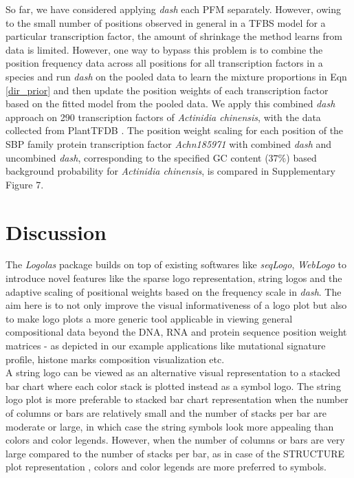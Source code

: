 \documentclass{bmcart}
\begin{document}
So far, we have considered applying \textit{dash}
each PFM separately. However, owing to the small number of positions observed in general in a TFBS model for a particular transcription factor, the amount of shrinkage the method learns from data is limited. However, one way to bypass this problem is to combine the position frequency data across all positions for all transcription factors in a species and run \textit{dash} on the pooled data to learn the mixture proportions in Eqn \ref{dir_prior} and then update the position weights of each transcription factor based on the fitted model from the pooled data. We apply this combined \textit{dash} approach on 290 transcription factors of \textit{Actinidia chinensis}, with the data collected from PlantTFDB \cite{Jin2017} \cite{Jin2015} \cite{Jin2014}. The position weight scaling for each position of the SBP family protein transcription factor \textit{Achn185971} with combined \textit{dash} and uncombined \textit{dash}, corresponding to the specified GC content ($37 \%$) based background probability for \textit{Actinidia chinensis}, is compared in Supplementary Figure 7.  


\section*{Discussion}

The \textit{Logolas} package builds on top of existing softwares like \textit{seqLogo}, \textit{WebLogo} \cite{Crooks2004} \cite{Bembom2017} to introduce novel features like the sparse logo representation, string logos and the adaptive scaling of positional weights based on the frequency scale in \textit{dash}. The aim here is to not only improve the visual informativeness of a logo plot but also to make logo plots a more generic tool applicable in viewing general compositional data beyond the DNA, RNA and protein sequence position weight matrices - as depicted in our example applications like mutational signature profile, histone marks composition visualization etc. \\ [3 pt]

A string logo can be viewed as an alternative visual representation to a stacked bar chart where each color stack is plotted instead as a symbol logo. The string logo plot is more preferable to stacked bar chart representation when the number of columns or bars are relatively small and the number of stacks per bar are moderate or large, in which case the string symbols look more appealing than colors and color legends. However, when the number of columns or bars are very large compared to the number of stacks per bar, as in case of the STRUCTURE plot representation \cite{Rosenberg2002} \cite{Dey2017}, colors and color legends are more preferred to symbols. \\ [3 pt]
\end{document}
